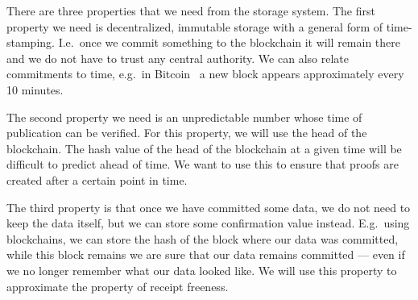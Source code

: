 There are three properties that we need from the storage system.
The first property we need is decentralized, immutable storage with a general 
form of time-stamping.
I.e.\ once we commit something to the blockchain it will remain there and we do 
not have to trust any central authority.
We can also relate commitments to time, e.g.\ in Bitcoin~\cite{Bitcoin} a new 
block appears approximately every 10 minutes.

The second property we need is an unpredictable number whose time of publication 
can be verified.
For this property, we will use the head of the blockchain.
The hash value of the head of the blockchain at a given time will be difficult 
to predict ahead of time.
We want to use this to ensure that proofs are created after a certain point in 
time.

The third property is that once we have committed some data, we do not need to 
keep the data itself, but we can store some confirmation value instead.
E.g.\ using blockchains, we can store the hash of the block where our data was 
committed, while this block remains we are sure that our data remains committed 
--- even if we no longer remember what our data looked like.
We will use this property to approximate the property of receipt freeness.

